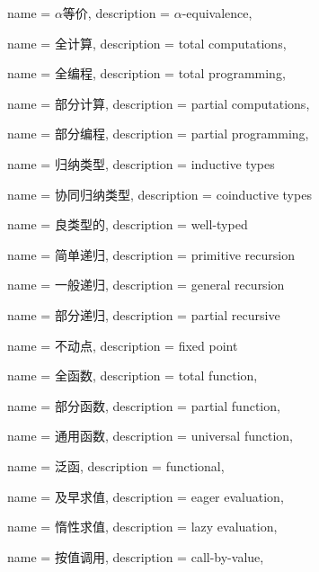 
{
    name = $\alpha$等价,
    description = {$\alpha$-equivalence},
}

{
	name = 全计算,
	description = {total computations},
}

{
	name = 全编程,
	description = {total programming},
}

{
	name = 部分计算,
	description = {partial computations},
}

{
	name = 部分编程,
	description = {partial programming},
}

{
	name = 归纳类型,
	description = {inductive types}
}

{
	name = 协同归纳类型,
	description = {coinductive types}
}

{
	name = 良类型的,
	description = {well-typed}
}

{
	name = 简单递归,
	description = {primitive recursion}
}


{
	name = 一般递归,
	description = {general recursion}
}

{
	name = 部分递归,
	description = {partial recursive}
}

{
	name = 不动点,
	description = {fixed point}
}

{
	name = 全函数,
	description = {total function},
}


{
	name = 部分函数,
	description = {partial function},
}

{
	name = 通用函数,
	description = {universal function},
}


{
	name = 泛函,
	description = {functional},
}

{
	name = 及早求值,
	description = {eager evaluation},
}

{
	name = 惰性求值,
	description = {lazy evaluation},
}

{
	name = 按值调用,
	description = {call-by-value},
}


